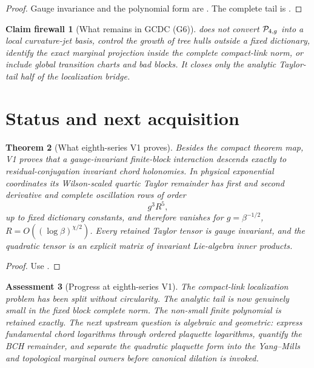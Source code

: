 \documentclass[11pt,oneside]{book}
\newtheorem{theorem}{Theorem}[chapter]
\newtheorem{assessment}[theorem]{Assessment}
\newtheorem{firewall}[theorem]{Claim firewall}
\theoremstyle{definition}
\theoremstyle{remark}
\begin{document}
\begin{proof}
Gauge invariance and the polynomial form are
.  The complete tail is
.
\end{proof}

\begin{firewall}[What remains in GCDC (G6)]
\label{fire:e8v1-GCDC}
 does not convert
\({\cal P}_{4,g}\) into a local curvature-jet basis, control the
growth of tree hulls outside a fixed dictionary, identify the exact
marginal projection inside the complete compact-link norm, or include
global transition charts and bad blocks.  It closes only the analytic
Taylor-tail half of the localization bridge.
\end{firewall}

\section{Status and next acquisition}
\label{sec:e8v1-status}

\begin{theorem}[What eighth-series V1 proves]
\label{thm:e8v1-result}
Besides the compact theorem map, V1 proves that a gauge-invariant
finite-block interaction descends exactly to residual-conjugation
invariant chord holonomies.  In physical exponential coordinates its
Wilson-scaled quartic Taylor remainder has first and second derivative
and complete oscillation rows of order
\[
 g^3R^5,
\]
up to fixed dictionary constants, and therefore vanishes for
\(g=\beta^{-1/2}\), \(R=O((\log\beta)^{\chi/2})\).
Every retained Taylor tensor is gauge invariant, and the quadratic
tensor is an explicit matrix of invariant Lie-algebra inner products.
\end{theorem}

\begin{proof}
Use
.
\end{proof}

\begin{assessment}[Progress at eighth-series V1]
\label{ass:e8v1-status}
The compact-link localization problem has been split without
circularity.  The analytic tail is now genuinely small in the fixed
block complete norm.  The non-small finite polynomial is retained
exactly.  The next upstream question is algebraic and geometric:
express fundamental chord logarithms through ordered plaquette
logarithms, quantify the BCH remainder, and separate the quadratic
plaquette form into the Yang--Mills and topological marginal owners
before canonical dilation is invoked.
\end{assessment}
\end{document}
